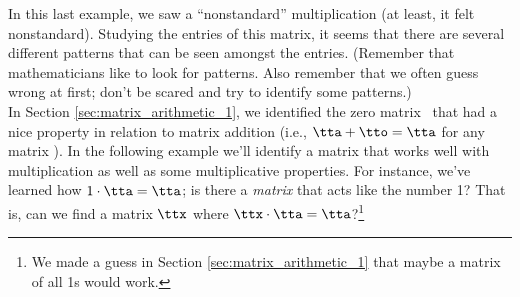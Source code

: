 In this last example, we saw a ``nonstandard'' multiplication (at least, it felt nonstandard). Studying the entries of this matrix, it seems that there are several different patterns that can be seen amongst the entries. (Remember that mathematicians like to look for patterns. Also remember that we often guess wrong at first; don't be scared and try to identify some patterns.)\\

In Section \ref{sec:matrix_arithmetic_1}, we identified the zero matrix \tto\ that had a nice property in relation to matrix addition (i.e., $\tta+\tto = \tta$ for any matrix \tta). In the following example we'll identify a matrix that works well with multiplication as well as some multiplicative properties. For instance, we've learned how $1\cdot\tta = \tta$; is there a \textit{matrix} that acts like the number 1? That is, can we find a matrix $\ttx$ where $\ttx\cdot\tta=\tta$?\footnote{We made a guess in Section \ref{sec:matrix_arithmetic_1} that maybe a matrix of all 1s would work.}

\medskip

